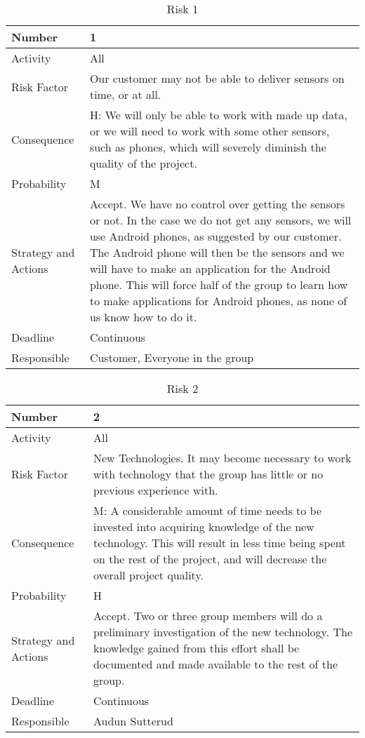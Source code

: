 \documentclass[../document.tex]{subfiles}
\begin{document}
\begin{table}[H]
\caption{Risk 1}
\begin{tabularx}{\textwidth}{|l|X|}
\hline
Number
&1
\\ \hline Activity
&All
\\ \hline Risk Factor
&Our customer may not be able to deliver sensors on time, or at all.
\\ \hline Consequence
&H: We will only be able to work with made up data, or we will need to work with some other sensors, such as phones, which will severely diminish the quality of the project.
\\ \hline Probability
&M
\\ \hline Strategy and Actions
&Accept. We have no control over getting the sensors or not. In the case we do not get any sensors, we will use \gls{Android} phones, as suggested by our customer. The \gls{Android} phone will then be the sensors and we will have to make an application for the \gls{Android} phone. This will force half of the group to learn how to make applications for \gls{Android} phones, as none of us know how to do it.
\\ \hline Deadline
&Continuous
\\ \hline Responsible
&Customer, Everyone in the group
\\ \hline 
\end{tabularx}
\end{table}

\begin{table}[H]
\caption{Risk 2}
\begin{tabularx}{\textwidth}{|l|X|}
\hline
Number
&2
\\ \hline Activity
&All
\\ \hline Risk Factor
&New Technologies. It may become necessary to work with technology that the group has little or no previous experience with.
\\ \hline Consequence
&M: A considerable amount of time needs to be invested into acquiring knowledge of the new technology. This will result in less time being spent on the rest of the project, and will decrease the overall project quality.
\\ \hline Probability
&H
\\ \hline Strategy and Actions
&Accept. Two or three group members will do a preliminary investigation of the new technology. The knowledge gained from this effort shall be documented and made available to the rest of the group.
\\ \hline Deadline
&Continuous
\\ \hline Responsible
&Audun Sutterud
\\ \hline 
\end{tabularx}
\end{table}
\end{document}
